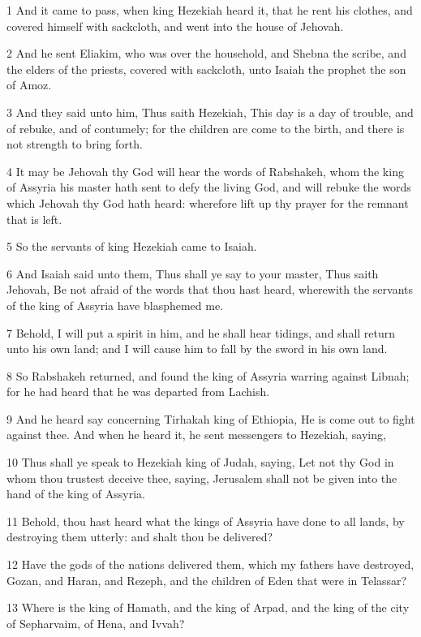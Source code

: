 \par 1 And it came to pass, when king Hezekiah heard it, that he rent his clothes, and covered himself with sackcloth, and went into the house of Jehovah.
\par 2 And he sent Eliakim, who was over the household, and Shebna the scribe, and the elders of the priests, covered with sackcloth, unto Isaiah the prophet the son of Amoz.
\par 3 And they said unto him, Thus saith Hezekiah, This day is a day of trouble, and of rebuke, and of contumely; for the children are come to the birth, and there is not strength to bring forth.
\par 4 It may be Jehovah thy God will hear the words of Rabshakeh, whom the king of Assyria his master hath sent to defy the living God, and will rebuke the words which Jehovah thy God hath heard: wherefore lift up thy prayer for the remnant that is left.
\par 5 So the servants of king Hezekiah came to Isaiah.
\par 6 And Isaiah said unto them, Thus shall ye say to your master, Thus saith Jehovah, Be not afraid of the words that thou hast heard, wherewith the servants of the king of Assyria have blasphemed me.
\par 7 Behold, I will put a spirit in him, and he shall hear tidings, and shall return unto his own land; and I will cause him to fall by the sword in his own land.
\par 8 So Rabshakeh returned, and found the king of Assyria warring against Libnah; for he had heard that he was departed from Lachish.
\par 9 And he heard say concerning Tirhakah king of Ethiopia, He is come out to fight against thee. And when he heard it, he sent messengers to Hezekiah, saying,
\par 10 Thus shall ye speak to Hezekiah king of Judah, saying, Let not thy God in whom thou trustest deceive thee, saying, Jerusalem shall not be given into the hand of the king of Assyria.
\par 11 Behold, thou hast heard what the kings of Assyria have done to all lands, by destroying them utterly: and shalt thou be delivered?
\par 12 Have the gods of the nations delivered them, which my fathers have destroyed, Gozan, and Haran, and Rezeph, and the children of Eden that were in Telassar?
\par 13 Where is the king of Hamath, and the king of Arpad, and the king of the city of Sepharvaim, of Hena, and Ivvah?
